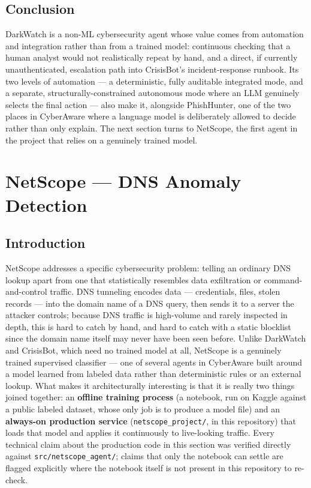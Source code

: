 \documentclass[12pt,a4paper]{report}
\newcommand{\ProjectName}{CyberAware}
\begin{document}
\subsection*{Conclusion}
DarkWatch is a non-ML cybersecurity agent whose value comes from automation and integration rather than from a trained model: continuous checking that a human analyst would not realistically repeat by hand, and a direct, if currently unauthenticated, escalation path into CrisisBot's incident-response runbook. Its two levels of automation --- a deterministic, fully auditable integrated mode, and a separate, structurally-constrained autonomous mode where an LLM genuinely selects the final action --- also make it, alongside PhishHunter, one of the two places in \ProjectName{} where a language model is deliberately allowed to decide rather than only explain. The next section turns to NetScope, the first agent in the project that relies on a genuinely trained model.

\section{NetScope --- DNS Anomaly Detection}

\subsection*{Introduction}
NetScope addresses a specific cybersecurity problem: telling an ordinary DNS lookup apart from one that statistically resembles data exfiltration or command-and-control traffic. DNS tunneling encodes data --- credentials, files, stolen records --- into the domain name of a DNS query, then sends it to a server the attacker controls; because DNS traffic is high-volume and rarely inspected in depth, this is hard to catch by hand, and hard to catch with a static blocklist since the domain name itself may never have been seen before. Unlike DarkWatch and CrisisBot, which need no trained model at all, NetScope is a genuinely trained supervised classifier --- one of several agents in \ProjectName{} built around a model learned from labeled data rather than deterministic rules or an external lookup. What makes it architecturally interesting is that it is really two things joined together: an \textbf{offline training process} (a notebook, run on Kaggle against a public labeled dataset, whose only job is to produce a model file) and an \textbf{always-on production service} (\texttt{netscope\_project/}, in this repository) that loads that model and applies it continuously to live-looking traffic. Every technical claim about the production code in this section was verified directly against \texttt{src/netscope\_agent/}; claims that only the notebook can settle are flagged explicitly where the notebook itself is not present in this repository to re-check.
\end{document}
